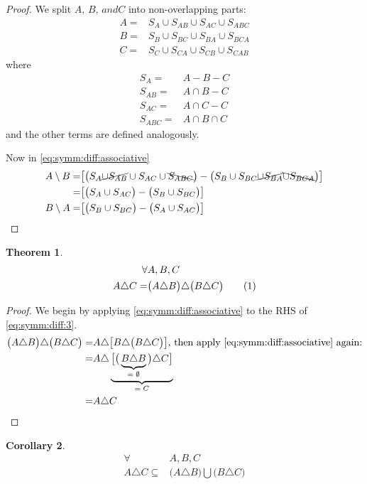 \documentclass[]{article}
\newcommand\numberthis{\addtocounter{equation}{1}\tag{\theequation}}
\newtheorem{thm}{Theorem}
\newtheorem{cor}[thm]{Corollary}
\begin{document}
\begin{appendices}
\begin{proof}
		We split $A,\,B,\, and C$ into non-overlapping parts:
		\begin{align*}
			A =& S_A \cup S_{AB} \cup S_{AC} \cup S_{ABC} \\
			B =& S_B \cup S_{BC} \cup S_{BA} \cup S_{BCA}\\
			C =& S_C \cup S_{CA} \cup S_{CB} \cup S_{CAB}
		\end{align*}
		where
		\begin{align*}
			S_A =& A - B - C\\
			S_{AB} =& A \cap B - C\\
			S_{AC} =& A \cap C - C\\
			S_{ABC} =& A \cap B \cap C 
		\end{align*}
		and the other terms are defined analogously.
		
		Now in \eqref{eq:symm:diff:associative}
		\begin{align*}
			A \setminus B =& \big[\big(S_A \cancel{\cup S_{AB}} \cup S_{AC} \cup \bcancel{S_{ABC}}\big) - \big(S_B \cup S_{BC} \cancel{\cup S_{BA}} \bcancel{\cup S_{BCA}}\big)\big]\\
			=& \big[\big(S_A  \cup S_{AC}\big) - \big(S_B \cup S_{BC} \big)\big]\\
			B \setminus A =& \big[\big(S_B  \cup S_{BC}\big) - \big(S_A \cup S_{AC} \big)\big]
		\end{align*}
	\end{proof}
	\begin{thm}
		\begin{align*}
			\forall& A,B,C\\
			A \triangle C =& \big(A\triangle B\big) \triangle \big(B\triangle C\big) \numberthis \label{eq:symm:diff:3}
		\end{align*}
	\end{thm}
	\begin{proof}
		We begin by applying \eqref{eq:symm:diff:associative} to the RHS of \eqref{eq:symm:diff:3}.
		\begin{align*}
			\big(A\triangle B\big) \triangle \big(B\triangle C\big) =& A \triangle \big[B \triangle \big(B\triangle C\big)\big] \text{, then apply \eqref{eq:symm:diff:associative} again:}\\
			=& A \triangle \underbrace{\big[\big(\underbrace{B \triangle B}_\text{$=\emptyset$}\big)\triangle C\big]}_\text{$=C$}\\
			=&A \triangle C
		\end{align*}
	\end{proof}
	\begin{cor}
			\begin{align*}
			\forall& A,B,C\\
			A \triangle C \subseteq& \big(A\triangle B\big) \bigcup \big(B\triangle C\big)
		\end{align*}
	\end{cor}
\end{appendices}

\printglossaries




\end{document}

